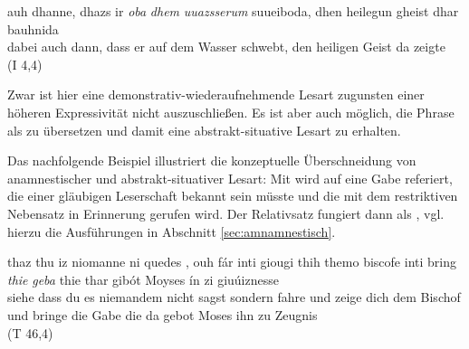 %

\begin{exe}
\ex \label{ex:I2245}  auh dhanne, dhazs ir \textit{oba} \textit{dhem} \textit{uuazsserum} suueiboda, dhen heilegun gheist dhar bauhnida  \\
{dabei} {auch} {dann}, {dass} {er} {auf} {dem} {Wasser} {schwebt}, {den} {heiligen} {Geist} {da} {zeigte}\\
\glt {} (I 4,4)
\end{exe}

\noindent 
Zwar ist hier  eine demonstrativ-wiederaufnehmende Lesart zugunsten einer höheren Expressivität nicht auszuschließen. Es ist aber auch möglich, die Phrase als  zu übersetzen und damit eine abstrakt-situative Lesart zu erhalten. 



Das nachfolgende Beispiel illustriert die konzeptuelle Überschneidung von anamnestischer und abstrakt-situativer Lesart: Mit  wird auf eine Gabe referiert, die einer gläubigen Leserschaft bekannt sein müsste und die mit dem restriktiven Nebensatz in Erinnerung gerufen wird. Der Relativsatz fungiert dann als  \parencite[78-79]{Himmelmann1997}, vgl. hierzu die Ausführungen in Abschnitt \ref{sec:amnamnestisch}. 

%

\begin{exe}
\ex \label{ex:T9827}  {thaz} {thu} {iz} {niomanne} {ni} {quedes} {,} {ouh} {fár} {inti} {giougi} {thih} {themo} {biscofe} {inti} {bring} {\textit{thie}} {\textit{geba}} {thie} {thar} {gibót} {Moyses} {ín} {zi} {giuúiznesse} \\
{siehe} {dass} {du} {es} {niemandem} {nicht} {sagst} {} {sondern} {fahre} {und} {zeige} {dich} {dem} {Bischof} {und} {bringe} {die} {Gabe} {die} {da} {gebot} {Moses} {ihn} {zu} {Zeugnis} {}\\
\glt {} (T 46,4)
\end{exe}


